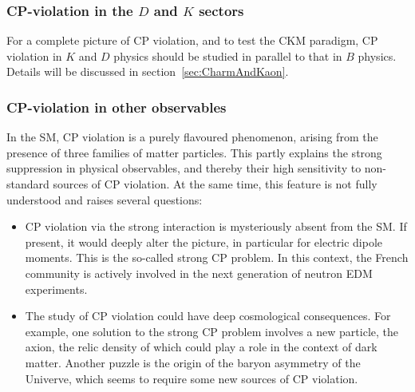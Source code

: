 








\subsubsection*{CP-violation in the $D$ and $K$ sectors}

For a complete picture of CP violation, and to test the CKM paradigm, CP
violation in $K$ and $D$ physics should be studied in parallel to that in $B$
physics. Details will be discussed in section~\ref{sec:CharmAndKaon}. 


\subsubsection*{CP-violation in other observables}

In the SM, CP violation is a purely flavoured phenomenon, arising from the
presence of three families of matter particles. This partly explains the
strong suppression in physical observables, and thereby their high sensitivity
to non-standard sources of CP violation. At the same time, this feature is not
fully understood and raises several questions:

\begin{itemize}
\item CP violation via the strong interaction is mysteriously absent from the
SM. If present, it would deeply alter the picture, in particular for electric
dipole moments. This is the so-called strong CP problem. In this context, the
French community is actively involved in the next generation of neutron EDM experiments.

\item The study of CP violation could have deep cosmological consequences. For
example, one solution to the strong CP problem involves a new particle, the
axion, the relic density of which could play a role in the context of dark matter.
Another puzzle is the origin of the baryon asymmetry of the Univerve, which
seems to require some new sources of CP violation.
\end{itemize}

